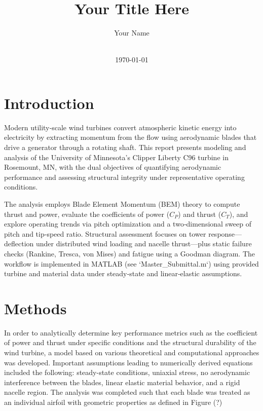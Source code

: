 \documentclass[11pt]{article}
\title{Your Title Here}
\author{Your Name}
\date{\\\today}
\begin{document}
\maketitle

\begin{abstract}
\end{abstract}

\tableofcontents
\newpage

\section{Introduction}

Modern utility‑scale wind turbines convert atmospheric kinetic energy into electricity by extracting momentum from the flow using aerodynamic blades that drive a generator through a rotating shaft. This report presents modeling and analysis of the University of Minnesota’s Clipper Liberty C96 turbine in Rosemount, MN, with the dual objectives of quantifying aerodynamic performance and assessing structural integrity under representative operating conditions.

The analysis employs Blade Element Momentum (BEM) theory to compute thrust and power, evaluate the coefficients of power (\(C_P\)) and thrust (\(C_T\)), and explore operating trends via pitch optimization and a two‑dimensional sweep of pitch and tip‑speed ratio. Structural assessment focuses on tower response—deflection under distributed wind loading and nacelle thrust—plus static failure checks (Rankine, Tresca, von Mises) and fatigue using a Goodman diagram. The workflow is implemented in MATLAB (see `Master_Submittal.m`) using provided turbine and material data under steady‑state and linear‑elastic assumptions.

\section{Methods}
In order to analytically determine key performance metrics such as the coefficient of power and thrust under specific conditions and the structural durability of the wind turbine, a model based on various theoretical and computational approaches was developed. Important assumptions leading to numerically derived equations included the following: steady-state conditions, uniaxial stress, no aerodynamic interference between the blades, linear elastic material behavior, and a rigid nacelle region. The analysis was completed such that each blade was treated as an individual airfoil with geometric properties as defined in Figure (?)
\end{document}
